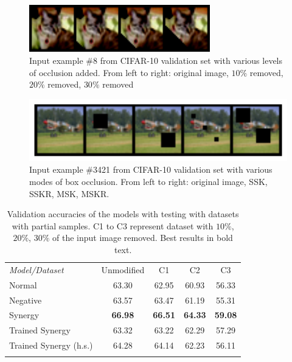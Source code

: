 \documentclass[b5paper]{book}
\begin{document}
\begin{figure}
    \centering
    \includegraphics[width=0.7\textwidth]{figures/fig3.png}
\caption{Input example \#8 from CIFAR-10 validation set with various levels of occlusion added. From left to right: original image, \( 10\% \) removed, \( 20\% \) removed, \( 30\% \) removed}
\label{fig:3} 
\end{figure}

\begin{figure}
    \centering
    \includegraphics[width=1\textwidth]{figures/fig4.png}
\caption{Input example \#3421 from CIFAR-10 validation set with various modes of box occlusion. From left to right: original image, SSK, SSKR, MSK, MSKR.}
\label{fig:4} 
\end{figure}

\begin{table}
\centering
\caption{Validation accuracies of the models with testing with datasets with partial samples. C1 to C3 represent dataset with \( 10\% \), \( 20\% \), \( 30\% \) of the input image removed. Best results in bold text.}
\label{tab:8}
\tabcolsep=0.06cm
\begin{tabular}{lcccc}
\hline\noalign{\smallskip}
\emph{Model/Dataset} & Unmodified & C1 & C2 & C3 \\
\noalign{\smallskip}\hline\noalign{\smallskip}
Normal & 63.30 & 62.95 & 60.93 & 56.33 \\
Negative & 63.57 & 63.47 & 61.19 & 55.31 \\
Synergy & \textbf{66.98} & \textbf{66.51} & \textbf{64.33} & \textbf{59.08}\\
Trained Synergy & 63.32 & 63.22 & 62.29 & 57.29\\
Trained Synergy (h.s.) & 64.28 & 64.14 & 62.23 & 56.11\\
\noalign{\smallskip}\hline
\end{tabular}
\end{table}
\end{document}

